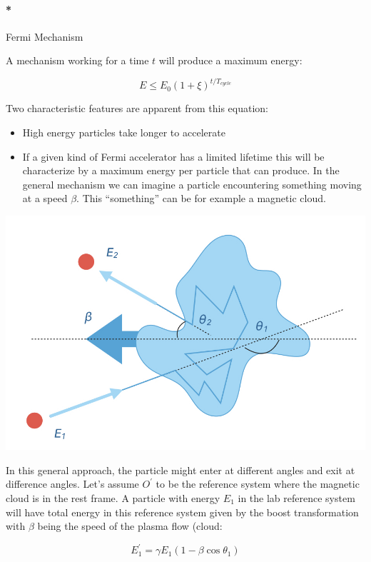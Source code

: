 \documentclass[
  letterpaper,
  DIV=11,
  numbers=noendperiod]{scrreprt}
\let\oldparagraph\paragraph
\renewcommand{\paragraph}[1]{\oldparagraph{#1}\mbox{}}
\providecommand{\tightlist}{%
  \setlength{\itemsep}{0pt}\setlength{\parskip}{0pt}}\usepackage{longtable,booktabs,array}
\begin{document}
\paragraph*{Fermi Mechanism}\label{fermi-mechanism}

A mechanism working for a time \(t\) will produce a maximum energy:

\[E\leq E_0 (1+\xi)^{t/T_{cycle}}\]

Two characteristic features are apparent from this equation:

\begin{itemize}
\tightlist
\item
  High energy particles take longer to accelerate
\item
  If a given kind of Fermi accelerator has a limited lifetime this will
  be characterize by a maximum energy per particle that can produce. In
  the general mechanism we can imagine a particle encountering something
  moving at a speed \(\beta\). This ``something'' can be for example a
  magnetic cloud.
\end{itemize}

\includegraphics{images/fermi_general.jpeg}

In this general approach, the particle might enter at different angles
and exit at difference angles. Let's assume \(O^\prime\) to be the
reference system where the magnetic cloud is in the rest frame. A
particle with energy \(E_1\) in the lab reference system will have total
energy in this reference system given by the boost transformation with
\(\beta\) being the speed of the plasma flow (cloud:

\[E_1^\prime = \gamma E_1 (1 -\beta \cos\theta_1)\]
\end{document}
